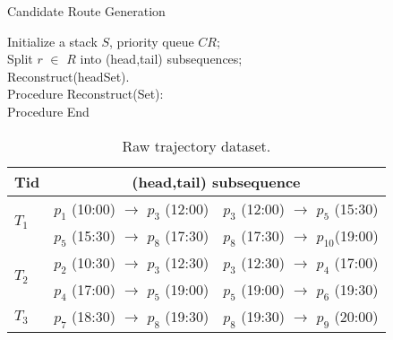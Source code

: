 \begin{algorithm}[t]
\label{algo:CRG}
\caption{Candidate Route Generation}
\small
\Indm
{}
\Indp
Initialize a stack $S$, priority queue $CR$;\\
Split $r$ $\in$ $R$ into (head,tail) subsequences;\\
Reconstruct(headSet).\\ 
Procedure Reconstruct(Set):\\
Procedure End\\
\end{algorithm}

\begin{table}[h]
 \centering
 \caption{Raw trajectory dataset.}
 \begin{footnotesize}
 \begin{tabular}{|l|l|l|} \cline{1-3}
Tid & \multicolumn{2}{c|}{(head,tail) subsequence} \\ \hline
\multirow{2}{*}{$T_{1}$} & $p_{1}$ (10:00) $\rightarrow$ $p_{3}$ (12:00) & $p_{3}$ (12:00) $\rightarrow$ $p_{5}$ (15:30) \\ \cline{2-3}
                         & $p_{5}$ (15:30) $\rightarrow$ $p_{8}$ (17:30) & $p_{8}$ (17:30) $\rightarrow$ $p_{10}$(19:00) \\ \cline{1-3}
\multirow{2}{*}{$T_{2}$} & $p_{2}$ (10:30) $\rightarrow$ $p_{3}$ (12:30) & $p_{3}$ (12:30) $\rightarrow$ $p_{4}$ (17:00) \\ \cline{2-3}
                         & $p_{4}$ (17:00) $\rightarrow$ $p_{5}$ (19:00) & $p_{5}$ (19:00) $\rightarrow$ $p_{6}$ (19:30) \\ \cline{1-3}
$T_{3}$                  & $p_{7}$ (18:30) $\rightarrow$ $p_{8}$ (19:30) & $p_{8}$ (19:30) $\rightarrow$ $p_{9}$ (20:00) \\ \hline
\end{tabular}
 \end{footnotesize}
 \label{Tab:raw_trj}
 \end{table}

